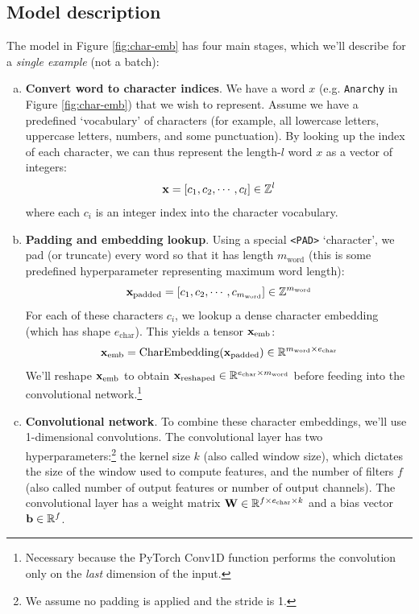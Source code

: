 \subsection*{Model description}
The model in Figure \ref{fig:char-emb} has four main stages, which we'll describe for a \textit{single example} (not a batch):
\begin{enumerate}[(a)]
    \item \textbf{Convert word to character indices}.
    We have a word $x$ (e.g. \texttt{Anarchy} in Figure \ref{fig:char-emb}) that we wish to represent. 
    Assume we have a predefined `vocabulary' of characters (for example, all lowercase letters, uppercase letters, numbers, and some punctuation).
    By looking up the index of each character, we can thus represent the length-$l$ word $x$ as a vector of integers:
    \begin{equation}
        \mathbf{x} = [c_1, c_2, \cdots, c_{l}] \in \mathbb{Z}^l
    \end{equation}
    where each $c_i$ is an integer index into the character vocabulary. 

    \item \textbf{Padding and embedding lookup}.
    Using a special \texttt{<PAD>} `character', 
    we pad (or truncate) every word so that it has length $m_\text{word}$ (this is some predefined hyperparameter representing maximum word length):
    \begin{equation}
        \mathbf{x}_{\text{padded}} = [c_1, c_2, \cdots, c_{m_{\text{word}}}] \in \mathbb{Z}^{m_\text{word}}
    \end{equation}
    For each of these characters $c_i$, we lookup a dense character embedding (which has shape $e_\text{char}$). This yields a tensor $\mathbf{x}_\text{emb}$:
    \begin{equation}
        \mathbf{x}_\text{emb} = \text{CharEmbedding}(\mathbf{x}_{\text{padded}}) \in \mathbb{R}^{m_{\text{word}}\times e_\text{char}}    
    \end{equation}
    We'll reshape $\mathbf{x}_\text{emb}$ to obtain $\mathbf{x}_{\text{reshaped}} \in \mathbb{R}^{e_\text{char} \times m_\text{word}}$ before feeding into the convolutional network.\footnote{Necessary because the PyTorch Conv1D function performs the convolution only on the \textit{last} dimension of the input.}
    \item \textbf{Convolutional network}.
    To combine these character embeddings, we'll use 1-dimensional convolutions. The convolutional layer has two hyperparameters:\footnote{We assume no padding is applied and the stride is 1.} the kernel size $k$ (also called window size), which dictates the size of the window used to compute features, and the number of filters $f$ (also called number of output features or number of output channels). 
    The convolutional layer has a weight matrix $\mathbf{W} \in \mathbb{R}^{f \times e_\text{char} \times k}$ and a bias vector $\mathbf{b} \in \mathbb{R}^f$.
    \newline
    

\end{enumerate}
